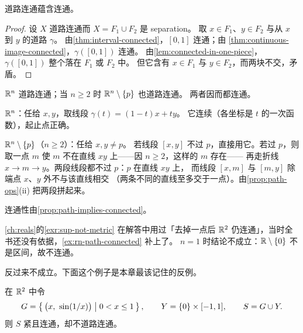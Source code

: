 \begin{proposition}
  \label{prop:path-implies-connected}
  道路连通蕴含连通。
\end{proposition}

\begin{proof}
  设 \(X\) 道路连通而 \(X = F_{1} \cup F_{2}\) 是 separation。
  取 \(x \in F_{1}\)、\(y \in F_{2}\) 与从 \(x\) 到 \(y\) 的道路 \(\gamma\)。
  由\cref{thm:interval-connected}，\([0,1]\) 连通；由%
  \cref{thm:continuous-image-connected}，\(\gamma([0,1])\) 连通。
  由\cref{lem:connected-in-one-piece}，\(\gamma([0,1])\) 整个落在 \(F_{1}\) 或 \(F_{2}\) 中。
  但它含有 \(x \in F_{1}\) 与 \(y \in F_{2}\)，而两块不交，矛盾。
\end{proof}

\begin{example}[欧氏空间与去掉一点的欧氏空间]
  \label{ex:rn-path-connected}
  \(\mathbb{R}^{n}\) 道路连通；当 \(n \ge 2\) 时 \(\mathbb{R}^{n} \setminus \left\{p\right\}\) 也道路连通。
  两者因而都连通。
  \begin{worked}
    \(\mathbb{R}^{n}\)：任给 \(x,y\)，取线段 \(\gamma(t) = (1-t)x + ty\)。
    它连续（各坐标是 \(t\) 的一次函数），起止点正确。

    \(\mathbb{R}^{n} \setminus \left\{p\right\}\)（\(n \ge 2\)）：任给 \(x,y \neq p\)。
    若线段 \([x,y]\) 不过 \(p\)，直接用它。若过 \(p\)，则取一点 \(m\)
    使 \(m\) 不在直线 \(xy\) 上——因 \(n \ge 2\)，这样的 \(m\) 存在——
    再走折线 \(x \to m \to y\)。两段线段都不过 \(p\)：\(p\) 在直线 \(xy\) 上，
    而线段 \([x,m]\) 与 \([m,y]\) 除端点 \(x\)、\(y\) 外不与该直线相交
    （两条不同的直线至多交于一点）。由\cref{prop:path-ops}(ii) 把两段拼起来。

    连通性由\cref{prop:path-implies-connected}。
  \end{worked}
\end{example}

\begin{remark}
  \cref{ch:reals}的\cref{exr:sup-not-metric} 在解答中用过「去掉一点后
  \(\mathbb{R}^{2}\) 仍连通」，当时全书还没有依据，\cref{ex:rn-path-connected} 补上了。
  \(n=1\) 时结论不成立：\(\mathbb{R} \setminus \left\{0\right\}\) 不是区间，故不连通。
\end{remark}

反过来不成立。下面这个例子是本章最该记住的反例。

\begin{example}[拓扑学家的正弦曲线]
  \label{ex:topologist-sine}
  在 \(\mathbb{R}^{2}\) 中令
  \begin{equation}
    \label{eq:sine-curve}
    G = \left\{\,\bigl(x,\ \sin(1/x)\bigr) \;\middle|\; 0 < x \le 1\,\right\}, \qquad
    Y = \left\{0\right\} \times [-1,1], \qquad S = G \cup Y .
  \end{equation}
  则 \(S\) 紧且连通，却不道路连通。
\end{example}

